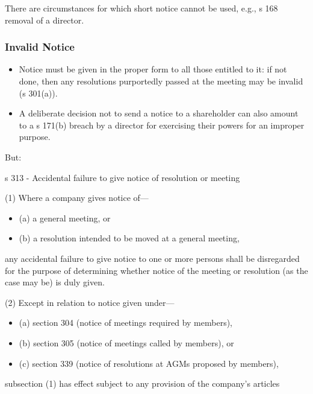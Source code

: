 \documentclass[
]{article}
\providecommand{\tightlist}{%
  \setlength{\itemsep}{0pt}\setlength{\parskip}{0pt}}
\newenvironment{env-12fb5320-b8eb-47b6-8035-097e16242c42}
{
    \savenotes\tcolorbox[blanker,breakable,left=5pt,borderline west={2pt}{-4pt}{green}]
}
{
    \endtcolorbox\spewnotes
}
\begin{document}
There are circumstances for which short notice cannot be used, e.g., s
168 removal of a director.

\hypertarget{invalid-notice}{%
\subsubsection{Invalid Notice}\label{invalid-notice}}

\begin{itemize}
\tightlist
\item
  Notice must be given in the proper form to all those entitled to it:
  if not done, then any resolutions purportedly passed at the meeting
  may be invalid (s 301(a)).
\item
  A deliberate decision not to send a notice to a shareholder can also
  amount to a s 171(b) breach by a director for exercising their powers
  for an improper purpose.
\end{itemize}

But:

\begin{env-12fb5320-b8eb-47b6-8035-097e16242c42}

s 313 - Accidental failure to give notice of resolution or meeting

(1) Where a company gives notice of---

\begin{itemize}
\tightlist
\item
  (a) a general meeting, or
\item
  (b) a resolution intended to be moved at a general meeting,
\end{itemize}

any accidental failure to give notice to one or more persons shall be
disregarded for the purpose of determining whether notice of the meeting
or resolution (as the case may be) is duly given.

(2) Except in relation to notice given under---

\begin{itemize}
\tightlist
\item
  (a) section 304 (notice of meetings required by members),
\item
  (b) section 305 (notice of meetings called by members), or
\item
  (c) section 339 (notice of resolutions at AGMs proposed by members),
\end{itemize}

subsection (1) has effect subject to any provision of the company's
articles

\end{env-12fb5320-b8eb-47b6-8035-097e16242c42}
\end{document}
